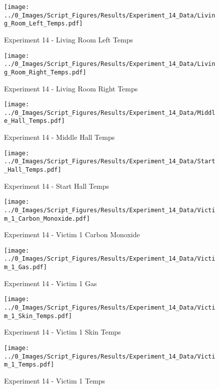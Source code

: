 	\clearpage

	\begin{figure}[H]
		\centering
		\texttt{[image: ../0\_Images/Script\_Figures/Results/Experiment\_14\_Data/Living\_Room\_Left\_Temps.pdf]}
		\caption[]{Experiment 14 - Living Room Left Temps}
	\end{figure}
 

	\begin{figure}[H]
		\centering
		\texttt{[image: ../0\_Images/Script\_Figures/Results/Experiment\_14\_Data/Living\_Room\_Right\_Temps.pdf]}
		\caption[]{Experiment 14 - Living Room Right Temps}
	\end{figure}
 
	\clearpage

	\begin{figure}[H]
		\centering
		\texttt{[image: ../0\_Images/Script\_Figures/Results/Experiment\_14\_Data/Middle\_Hall\_Temps.pdf]}
		\caption[]{Experiment 14 - Middle Hall Temps}
	\end{figure}
 

	\begin{figure}[H]
		\centering
		\texttt{[image: ../0\_Images/Script\_Figures/Results/Experiment\_14\_Data/Start\_Hall\_Temps.pdf]}
		\caption[]{Experiment 14 - Start Hall Temps}
	\end{figure}
 
	\clearpage

	\begin{figure}[H]
		\centering
		\texttt{[image: ../0\_Images/Script\_Figures/Results/Experiment\_14\_Data/Victim\_1\_Carbon\_Monoxide.pdf]}
		\caption[]{Experiment 14 - Victim 1 Carbon Monoxide}
	\end{figure}
 

	\begin{figure}[H]
		\centering
		\texttt{[image: ../0\_Images/Script\_Figures/Results/Experiment\_14\_Data/Victim\_1\_Gas.pdf]}
		\caption[]{Experiment 14 - Victim 1 Gas}
	\end{figure}
 
	\clearpage

	\begin{figure}[H]
		\centering
		\texttt{[image: ../0\_Images/Script\_Figures/Results/Experiment\_14\_Data/Victim\_1\_Skin\_Temps.pdf]}
		\caption[]{Experiment 14 - Victim 1 Skin Temps}
	\end{figure}
 

	\begin{figure}[H]
		\centering
		\texttt{[image: ../0\_Images/Script\_Figures/Results/Experiment\_14\_Data/Victim\_1\_Temps.pdf]}
		\caption[]{Experiment 14 - Victim 1 Temps}
	\end{figure}
 
